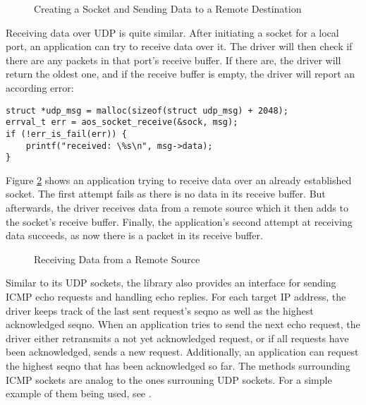 \begin{figure}[H]
    \centering
    \resizebox{\textwidth}{!} {
        
    }
    \caption{Creating a Socket and Sending Data to a Remote Destination}
    \label{fig:enet_send}
    
\end{figure}

Receiving data over UDP is quite similar. After initiating a socket for a local port, an application can try to receive data over it. The driver will then check if there are any packets in that port's receive buffer. If there are, the driver will return the oldest one, and if the receive buffer is empty, the driver will report an according error:
\begin{mdframed}[style=myframe]
\begin{verbatim}
struct *udp_msg = malloc(sizeof(struct udp_msg) + 2048);
errval_t err = aos_socket_receive(&sock, msg);
if (!err_is_fail(err)) {
    printf("received: \%s\n", msg->data);
}
\end{verbatim}
\end{mdframed}

Figure \ref{fig:enet_recv} shows an application trying to receive data over an already established socket. The first attempt fails as there is no data in its receive buffer. But afterwards, the driver receives data from a remote source which it then adds to the socket's receive buffer. Finally, the application's second attempt at receiving data succeeds, as now there is a packet in its receive buffer.

\begin{figure}[H]
\centering
    \resizebox{\textwidth}{!} {
        
    }
    \caption{Receiving Data from a Remote Source}
    \label{fig:enet_recv}
\end{figure}

Similar to its UDP sockets, the library also provides an interface for sending ICMP echo requests and handling echo replies. For each target IP address, the driver keeps track of the last sent request's seqno as well as the highest acknowledged seqno. When an application tries to send the next echo request, the driver either retransmits a not yet acknowledged request, or if all requests have been acknowledged, sends a new request. Additionally, an application can request the highest seqno that has been acknowledged so far. The methods surrounding ICMP sockets are analog to the ones surrouning UDP sockets. For a simple example of them being used, see .

